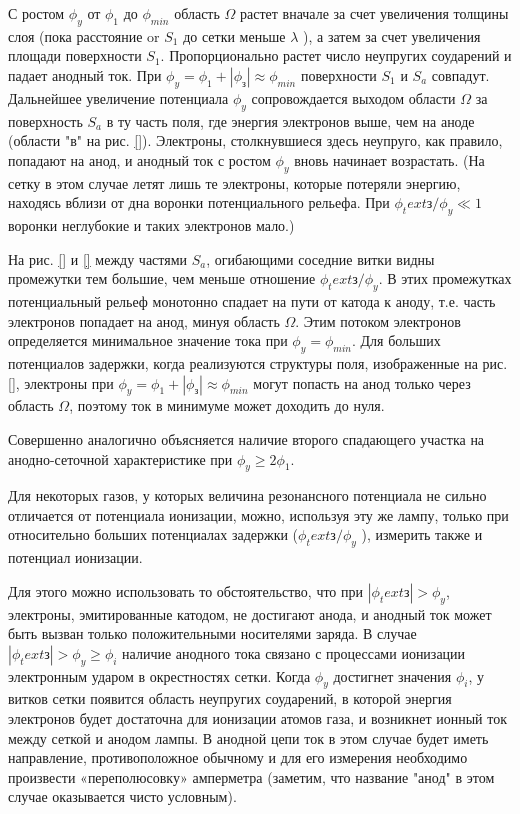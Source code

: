 {С ростом $\phi_y$ от $\phi_1$ до $\phi_{min}$ область $\Omega$ растет вначале за счет увеличения толщины слоя (пока расстояние or $S_1$ до сетки меньше $\lambda$ ), а затем за счет увеличения площади поверхности $S_1$. Пропорционально растет число неупругих соударений и падает анодный ток. При $\phi_y=\phi_1+|\phi_\text{з}| \approx \phi_{min}$ поверхности $S_1$ и $S_a$ совпадут. Дальнейшее увеличение потенциала $\phi_y$ сопровождается выходом области $\Omega$ за поверхность $S_a$ в ту часть поля, где энергия электронов выше, чем на аноде (области "в" на рис. \ref{}). Электроны, столкнувшиеся здесь неупруго, как правило, попадают на анод, и анодный ток с ростом $\phi_y$ вновь начинает возрастать. (На сетку в этом случае летят лишь те электроны, которые потеряли энергию, находясь вблизи от дна воронки потенциального рельефа. При $\phi_text{з}/ \phi_y \ll 1$ воронки неглубокие и таких электронов мало.)

На рис. \ref{} и \ref{} между частями $S_a$, огибающими соседние витки видны промежутки тем большие, чем меньше отношение $\phi_text{з}/ \phi_y$. В этих промежутках потенциальный рельеф монотонно спадает на пути от катода к аноду, т.е. часть электронов попадает на анод, минуя область $\Omega$. Этим потоком электронов определяется минимальное значение тока при $\phi_y=\phi_{min}$. Для больших потенциалов задержки, когда реализуются структуры поля, изображенные на рис. \ref{}, электроны при $\phi_y=\phi_1+|\phi_\text{з}| \approx \phi_{min}$ могут попасть на анод только через область $\Omega$, поэтому ток в минимуме может доходить до нуля.

Совершенно аналогично объясняется наличие второго спадающего участка на анодно-сеточной характеристике при $\phi_y \geq 2\phi_1$.

Для некоторых газов, у которых величина резонансного потенциала не сильно отличается от потенциала ионизации, можно, используя эту же лампу, только при относительно больших потенциалах задержки ($\phi_text{з}/ \phi_y$ ), измерить также и потенциал ионизации.

Для этого можно использовать то обстоятельство, что при $|\phi_text{з}|> \phi_y$, электроны, эмитированные катодом, не достигают анода, и анодный ток может быть вызван только положительными носителями заряда. В случае $|\phi_text{з}|> \phi_y \geq \phi_i$ наличие анодного тока связано с процессами ионизации электронным ударом в окрестностях сетки. Когда $\phi_y$ достигнет значения $\phi_i$, у витков сетки появится область неупругих соударений, в которой энергия электронов будет достаточна для ионизации атомов газа, и возникнет ионный ток между сеткой и анодом лампы. В анодной цепи ток в этом случае будет иметь направление, противоположное обычному и для его измерения необходимо произвести «переполюсовку» амперметра (заметим, что название "анод" в этом случае оказывается чисто условным).

}
